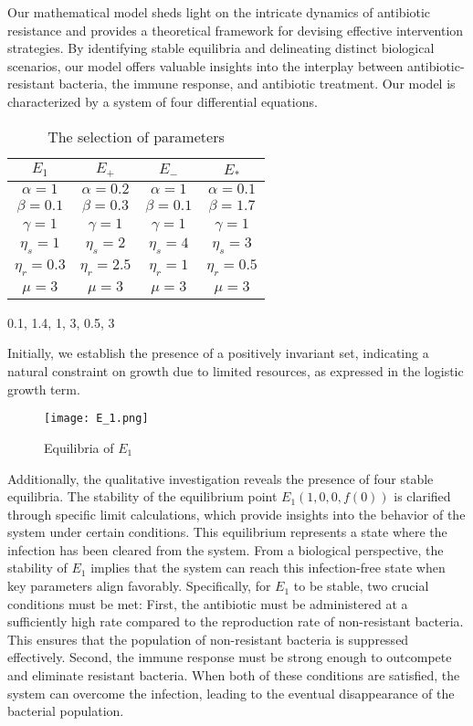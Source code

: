 Our mathematical model sheds light on the intricate dynamics of antibiotic resistance and provides a theoretical framework for devising effective intervention strategies. By identifying stable equilibria and delineating distinct biological scenarios, our model offers valuable insights into the interplay between antibiotic-resistant bacteria, the immune response, and antibiotic treatment. Our model is characterized by a system of four differential equations.

\begin{table}[ht]
	\centering
	\caption{The selection of parameters}
	\label{tab:parameters}
	\begin{tabular}{cccc}
		\hline
		\textbf{$E_1$} & \textbf{$E_+$} & \textbf{$E_-$} & \textbf{$E_*$} \\ 
		\hline
		$\alpha = 1$ 	& $\alpha = 0.2$ 	& $\alpha = 1$ 	& $\alpha = 0.1$ \\
		$\beta = 0.1$ 	& $\beta = 0.3$ 		& $\beta = 0.1$ & $\beta = 1.7$ \\
		$\gamma = 1$ 	& $\gamma = 1$ 		& $\gamma = 1$ 	& $\gamma = 1$ \\
		$\eta_s = 1$ 	& $\eta_s = 2$ 		& $\eta_s = 4$ 	& $\eta_s = 3$ \\
		$\eta_r = 0.3$ 	& $\eta_r = 2.5$ 	& $\eta_r = 1$ 	& $\eta_r = 0.5$ \\
		$\mu = 3$ 		& $\mu = 3$ 		& $\mu = 3$ 	& $\mu = 3$ \\
		\hline
	\end{tabular}
\end{table}
0.1, 1.4, 1, 3, 0.5, 3

Initially, we establish the presence of a positively invariant set, indicating a natural constraint on growth due to limited resources, as expressed in the logistic growth term.

\begin{figure}
	\centering
	\caption{Equilibria of $E_1$}
	\label{fig:e1}
	\texttt{[image: E\_1.png]}
\end{figure}


Additionally, the qualitative investigation reveals the presence of four stable equilibria. The stability of the equilibrium point $E_1 \left(1, 0, 0, f(0)\right)$ is clarified through specific limit calculations, which provide insights into the behavior of the system under certain conditions. This equilibrium represents a state where the infection has been cleared from the system. From a biological perspective, the stability of $E_1$ implies that the system can reach this infection-free state when key parameters align favorably. Specifically, for $E_1$ to be stable, two crucial conditions must be met: First, the antibiotic must be administered at a sufficiently high rate compared to the reproduction rate of non-resistant bacteria. This ensures that the population of non-resistant bacteria is suppressed effectively. Second, the immune response must be strong enough to outcompete and eliminate resistant bacteria. When both of these conditions are satisfied, the system can overcome the infection, leading to the eventual disappearance of the bacterial population.


